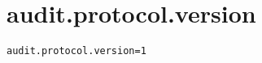 \section{audit.protocol.version}
\label{configuration:AuditProtocolVersion}
\AvailableInJavaOnly{\TODO}
\begin{lstlisting}[style=Props,caption={Usage example for \textit{audit.protocol.version}}]
audit.protocol.version=1
\end{lstlisting}